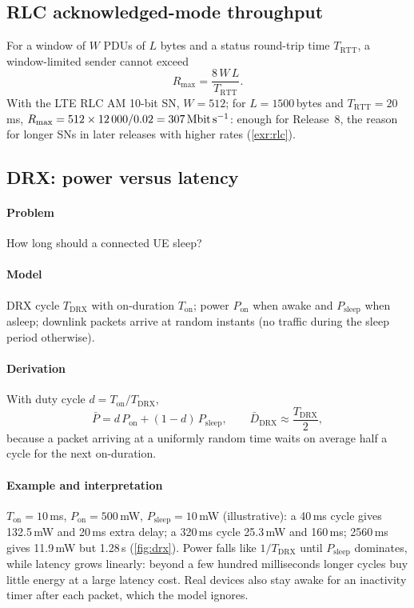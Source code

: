 \documentclass[11pt,a4paper]{article}
\begin{document}
\subsection{RLC acknowledged-mode throughput}\label{sec:rlcwin}
For a window of $W$ PDUs of $L$ bytes and a status round-trip time $T_{\mathrm{RTT}}$, a
window-limited sender cannot exceed
\begin{equation}\label{eq:rlc}
  R_{\max} = \frac{8\,W\,L}{T_{\mathrm{RTT}}} .
\end{equation}
With the LTE RLC AM 10-bit SN, $W = 512$; for $L = 1500$\,bytes and $T_{\mathrm{RTT}} = 20$\,ms,
$R_{\max} = 512\times12\,000/0.02 = \qty{307}{\mega\bit\per\second}$: enough for Release~8, the
reason for longer SNs in later releases with higher rates (\cref{exr:rlc}).

\subsection{DRX: power versus latency}\label{sec:drx}
\paragraph{Problem} How long should a connected UE sleep?
\paragraph{Model} DRX cycle $T_{\mathrm{DRX}}$ with on-duration $T_{\mathrm{on}}$; power
$P_{\mathrm{on}}$ when awake and $P_{\mathrm{sleep}}$ when asleep; downlink packets arrive at random
instants (no traffic during the sleep period otherwise).
\paragraph{Derivation} With duty cycle $d = T_{\mathrm{on}}/T_{\mathrm{DRX}}$,
\begin{equation}\label{eq:drx}
  \bar P = d\,P_{\mathrm{on}} + (1-d)\,P_{\mathrm{sleep}}, \qquad
  \bar D_{\mathrm{DRX}} \approx \frac{T_{\mathrm{DRX}}}{2},
\end{equation}
because a packet arriving at a uniformly random time waits on average half a cycle for the next
on-duration.
\paragraph{Example and interpretation} $T_{\mathrm{on}} = 10$\,ms, $P_{\mathrm{on}} = 500$\,mW,
$P_{\mathrm{sleep}} = 10$\,mW (illustrative): a 40\,ms cycle gives 132.5\,mW and 20\,ms extra delay;
a 320\,ms cycle 25.3\,mW and 160\,ms; 2560\,ms gives 11.9\,mW but 1.28\,s (\cref{fig:drx}). Power falls
like $1/T_{\mathrm{DRX}}$ until $P_{\mathrm{sleep}}$ dominates, while latency grows linearly: beyond a
few hundred milliseconds longer cycles buy little energy at a large latency cost. Real devices
also stay awake for an inactivity timer after each packet, which the model ignores.
\end{document}
